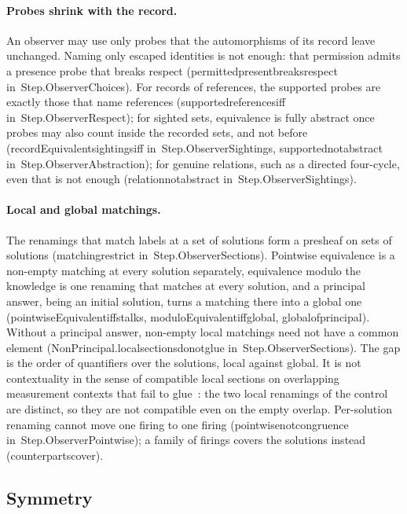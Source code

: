 \documentclass[11pt]{article}
\theoremstyle{remark}
\newcommand{\lean}[1]{{\ttfamily\def\_{\textunderscore\allowbreak}#1}}
\newcommand{\inmod}[1]{in~{\ttfamily\def\_{\textunderscore\allowbreak}#1}}
\begin{document}
\paragraph{Probes shrink with the record.} An observer may use only probes that the automorphisms of
its record leave unchanged. Naming only escaped identities is not enough: that permission admits a
presence probe that breaks respect (\lean{permitted\_present\_breaks\_respect} \inmod{Step.ObserverChoices}).
For records of references, the supported probes are exactly those that name references
(\lean{supported\_references\_iff} \inmod{Step.ObserverRespect}); for sighted sets, equivalence is fully abstract once probes may also
count inside the recorded sets, and not before (\lean{recordEquivalent\_sightings\_iff} \inmod{Step.ObserverSightings},
\lean{supported\_not\_abstract} \inmod{Step.ObserverAbstraction}); for genuine relations, such as a directed
four-cycle, even that is not enough (\lean{relation\_not\_abstract} \inmod{Step.ObserverSightings}).

\paragraph{Local and global matchings.} The renamings that match labels at a set of solutions form a
presheaf on sets of solutions (\lean{matching\_restrict} \inmod{Step.ObserverSections}). Pointwise
equivalence is a non-empty matching at every solution separately, equivalence modulo the knowledge is
one renaming that matches at every solution, and a principal answer, being an initial solution, turns a
matching there into a global one (\lean{pointwiseEquivalent\_iff\_stalks}, \lean{moduloEquivalent\_iff\_global},
\lean{global\_of\_principal}). Without a principal answer, non-empty local matchings need not have a
common element (\lean{NonPrincipal.local\_sections\_do\_not\_glue} \inmod{Step.ObserverSections}). The gap is the order of quantifiers over
the solutions, local against global. It is not contextuality in the sense of compatible local sections
on overlapping measurement contexts that fail to glue~\cite{abramskybrandenburger11}: the two local
renamings of the control are distinct, so they are not compatible even on the empty overlap.
Per-solution renaming cannot move one firing to one firing (\lean{pointwise\_not\_congruence}
\inmod{Step.ObserverPointwise}); a family of firings covers the solutions instead (\lean{counterparts\_cover}).

\subsection{Symmetry}
\end{document}
